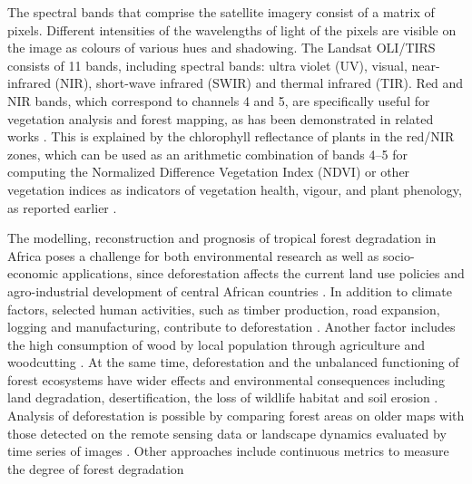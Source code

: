 \documentclass[applsci,article,accept,pdftex,moreauthors]{Definitions/mdpi}
\begin{document}
The spectral bands that comprise the satellite imagery consist of a matrix of pixels. Different intensities of the wavelengths of light of the pixels are visible on the image as colours of various hues and shadowing. The Landsat OLI/TIRS consists of 11 bands, including spectral bands: ultra violet (UV), visual, near-infrared (NIR), short-wave infrared (SWIR) and thermal infrared (TIR). Red and NIR bands, which correspond to channels 4 and 5, are specifically useful for vegetation analysis and forest mapping, as has been demonstrated in related works \cite{DALPONTE2020102206,HUANG2022100006,WANG2022113021}. This is explained by the chlorophyll reflectance of plants in the red/NIR zones, which can be used as an arithmetic combination of bands 4--5 for computing the Normalized Difference Vegetation Index (NDVI) \cite{HUETE2002195} or other vegetation indices \cite{JIANG20083833,HUETE1988295} as indicators of vegetation health, vigour, and plant phenology, as reported earlier \cite{SOUDANI2012234,Lemenkova202019,1026428,HMIMINA2013145}.

The modelling, reconstruction and prognosis of tropical forest degradation in Africa poses a challenge for both environmental research as well as socio-economic applications, since deforestation affects the current land use policies and agro-industrial development of central African countries \cite{TEGEGNE2016312,f13091508}. In addition to climate factors, selected human activities, such as timber production, road expansion, logging and manufacturing, contribute to deforestation \cite{BRANDT201615,TRITSCH2020106660,Lietal2015}. Another factor includes the high consumption of wood by local population through agriculture and woodcutting \cite{Iloweka}. At the same time, deforestation and the unbalanced functioning of forest ecosystems have wider effects and environmental consequences including land degradation, desertification, the loss of wildlife habitat and soil erosion \cite{AQUILAS2022100553}. Analysis of deforestation is possible by comparing forest areas on older maps with those detected on the remote sensing data \cite{rs12040638,land10101042,Zhangetal2005} or landscape dynamics evaluated by time series of images \cite{land11091541}. Other approaches include continuous metrics to measure the degree of forest degradation \cite{SHAPIRO2021107268}
 
\end{document}
